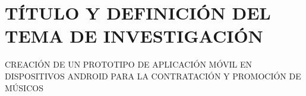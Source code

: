 \chapter{TÍTULO Y DEFINICIÓN DEL TEMA DE INVESTIGACIÓN}
CREACIÓN DE UN PROTOTIPO DE APLICACIÓN MÓVIL EN DISPOSITIVOS ANDROID PARA LA CONTRATACIÓN Y PROMOCIÓN DE MÚSICOS 